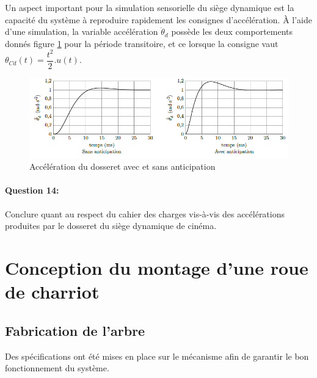 Un aspect important pour la simulation sensorielle du siège dynamique est la capacité du système à reproduire rapidement les consignes d'accélération. À l'aide d'une simulation, la variable accélération $\ddot{\theta}_d$ possède les deux comportements donnés figure \ref{fig17} pour la période transitoire, et ce lorsque la consigne vaut $\theta_{Cd}(t)=\dfrac{t^2}{2}.u(t)$.

\newpage 

\begin{figure}[!ht]
\begin{center}
 \includegraphics[width=0.8\linewidth]{img/img18}
\end{center}
\caption{Accélération du dosseret avec et sans anticipation}
\label{fig17}
\end{figure}

\paragraph{Question 14:} Conclure quant au respect du cahier des charges vis-à-vis des accélérations produites par le dosseret du siège dynamique de cinéma.

\section{Conception du montage d'une roue de charriot}

\subsection{Fabrication de l'arbre}

Des spécifications ont été mises en place sur le mécanisme afin de garantir le bon fonctionnement du système.

